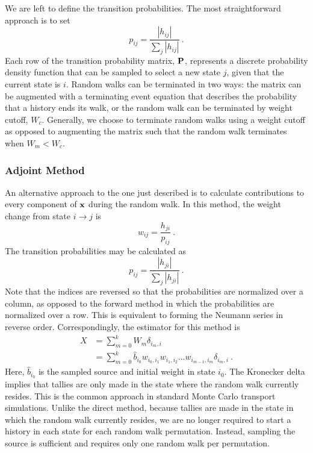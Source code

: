 We are left to define the transition probabilities. The most straightforward
approach is to set
\begin{equation}
  p_{ij} = \frac{|h_{ij}|}{\sum_{j}|h_{ij}|}\:.
  \label{eq:probability}
\end{equation}
Each row of the transition probability matrix, $\mathbf{P}$, represents a discrete
probability density function that can be sampled to select a new state $j$,
given that the current state is $i$.  Random walks can be terminated in two
ways: the matrix can be augmented with a terminating event equation that
describes the probability that a history ends its walk, or the random walk can
be terminated by weight cutoff, $W_c$.  Generally, we choose to terminate
random walks using a weight cutoff as opposed to augmenting the matrix such
that the random walk terminates when $W_m < W_c$.


\subsubsection{Adjoint Method}
\label{sec:adjoint-method}

An alternative approach to the one just described is to calculate
contributions to every component of $\mathbf{x}$ during the random walk. In this
method, the weight change from state $i\rightarrow j$ is
\begin{equation}
  w_{ij} = \frac{h_{ji}}{p_{ij}}\:.
  \label{eq:adjoint-weight}
\end{equation}
The transition probabilities may be calculated as
\begin{equation}
  p_{ij} = \frac{|h_{ji}|}{\sum_{j}|h_{ji}|}\:.
  \label{eq:adjoint-probability}
\end{equation}
Note that the indices are reversed so that the probabilities are
normalized over a column, as opposed to the forward method in which
the probabilities are normalized over a row.  This is equivalent to
forming the Neumann series in reverse order.  Correspondingly, the
estimator for this method is
\begin{equation}
  \begin{split}
    X &= \sum_{m=0}^{k}W_m\delta_{i_m,i}\\
    &= \sum_{m=0}^{k}\hat{b}_{i_0}w_{i_0,i_1}w_{i_1,i_2}\ldots
                                  w_{i_{m-1},i_m}\delta_{i_m,i}\:.
  \end{split}
  \label{eq:adjoint-tally}
\end{equation}
Here, $\hat{b}_{i_0}$ is the sampled source and initial weight in state $i_0$.
The Kronecker delta implies that tallies are only made in the state where the
random walk currently resides.  This is the common approach in standard Monte
Carlo transport simulations. Unlike the direct method, because tallies are
made in the state in which the random walk currently resides, we are no longer
required to start a history in each state for each random walk
permutation. Instead, sampling the source is sufficient and requires only one
random walk per permutation.

